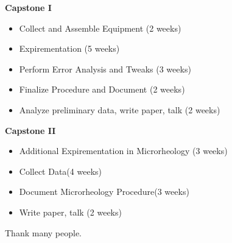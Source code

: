 \documentclass[aps,prb,twocolumn,groupedaddress,nofootinbib,floatfix]{revtex4}
\begin{document}
\vspace{0.2in}
{\bf Capstone I}
\begin{itemize}\itemsep1pt \parskip0pt 
\item Collect and Assemble Equipment (2 weeks)
\item Expirementation (5 weeks)
\item Perform Error Analysis and Tweaks (3 weeks)
\item Finalize Procedure and Document (2 weeks)
\item Analyze preliminary data, write paper, talk (2 weeks)
\end{itemize}
{\bf Capstone II} 
\begin{itemize}\itemsep1pt \parskip0pt
\item Additional Expirementation in Microrheology (3 weeks)
\item Collect Data(4 weeks)
\item Document Microrheology Procedure(3 weeks)
\item Write paper, talk (2 weeks)
\end{itemize}

\begin{acknowledgments}
Thank many people.
\end{acknowledgments}
%
%



\end{document}
